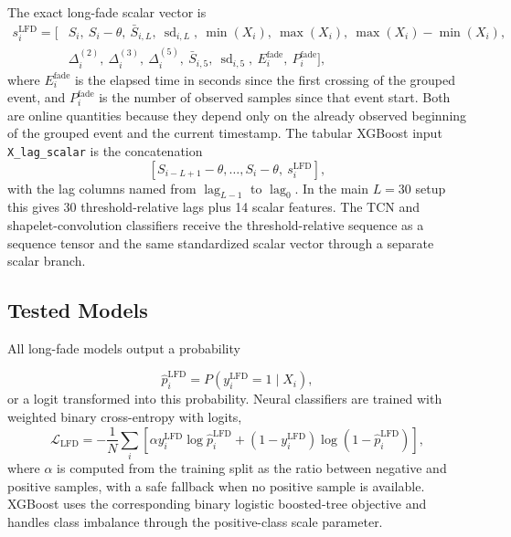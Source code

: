The exact long-fade scalar vector is
\[
\begin{aligned}
  s_i^{\text{LFD}} = [
  &S_i,\ S_i-\theta,\ \bar{S}_{i,L},\
  \operatorname{sd}_{i,L},\
  \min(X_i),\ \max(X_i),\
  \max(X_i)-\min(X_i),\\
  &\Delta_i^{(2)},\ \Delta_i^{(3)},\ \Delta_i^{(5)},\
  \bar{S}_{i,5},\ \operatorname{sd}_{i,5},\
  E_i^{\text{fade}},\ P_i^{\text{fade}}
  ] ,
\end{aligned}
\]
where \(E_i^{\text{fade}}\) is the elapsed time in seconds since the first
crossing of the grouped event, and \(P_i^{\text{fade}}\) is the number of
observed samples since that event start. Both are online quantities because they
depend only on the already observed beginning of the grouped event and the
current timestamp. The tabular XGBoost input \texttt{X\_lag\_scalar} is the
concatenation
\[
  [
  S_{i-L+1}-\theta,\ldots,S_i-\theta,\ s_i^{\text{LFD}}
  ],
\]
with the lag columns named from \(\operatorname{lag}_{L-1}\) to
\(\operatorname{lag}_{0}\). In the main \(L=30\) setup this gives 30
threshold-relative lags plus 14 scalar features. The TCN and
shapelet-convolution classifiers receive the threshold-relative sequence as a
sequence tensor and the same standardized scalar vector through a separate
scalar branch.

\subsection{Tested Models}
All long-fade models output a probability

\[
  \widehat{p}_i^{\text{LFD}}
  =
  P(y_i^{\text{LFD}}=1 \mid X_i),
\]
or a logit transformed into this probability. Neural classifiers are trained
with weighted binary cross-entropy with logits,
\[
  \mathcal{L}_{\mathrm{LFD}}
  =
  -\frac{1}{N}
  \sum_i
  \left[
    \alpha y_i^{\text{LFD}}\log \widehat{p}_i^{\text{LFD}}
    +
    (1-y_i^{\text{LFD}})
    \log(1-\widehat{p}_i^{\text{LFD}})
  \right],
\]
where \(\alpha\) is computed from the training split as the ratio between
negative and positive samples, with a safe fallback when no positive sample is
available. XGBoost uses the corresponding binary logistic boosted-tree
objective and handles class imbalance through the positive-class scale
parameter.

